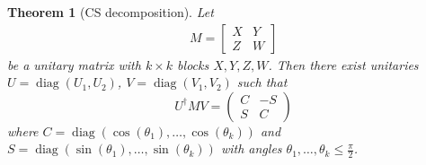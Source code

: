 \documentclass[11pt]{article}
\newtheorem{thm}{Theorem}
\newcommand{\diag}{\operatorname{diag}}
\begin{document}
\begin{thm}[CS decomposition]
Let
\begin{align}
    M = \begin{bmatrix}X & Y \\ Z & W\end{bmatrix}
\end{align}
be a unitary matrix with $k \times k$ blocks $X, Y, Z, W$. Then there exist unitaries $U = \diag(U_1, U_2)$, $V = \diag(V_1, V_2)$ such that
$$
U^\dagger M V = \begin{pmatrix}C & -S \\ S & C\end{pmatrix}
$$
where $C = \diag(\cos(\theta_1), \dots, \cos(\theta_k))$ and $S = \diag(\sin(\theta_1), \dots, \sin(\theta_k))$ with angles $\theta_1, \dots, \theta_k \leq \frac{\pi}{2}$.
\end{thm}
\end{document}

